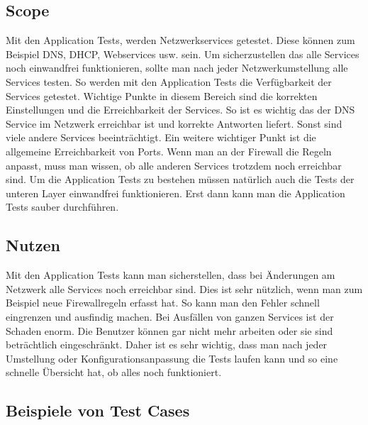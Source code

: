 \documentclass[a4,12pt]{scrartcl}
\begin{document}
\subsection{Scope}
Mit den Application Tests, werden Netzwerkservices getestet. Diese können zum Beispiel DNS, DHCP, Webservices usw. sein.
Um sicherzustellen das alle Services noch einwandfrei funktionieren, sollte man nach jeder Netzwerkumstellung alle Services testen. So werden mit den Application Tests die Verfügbarkeit der Services getestet.\newline\newline
Wichtige Punkte in diesem Bereich sind die korrekten Einstellungen und die Erreichbarkeit der Services. So ist es wichtig das der DNS Service im Netzwerk erreichbar ist und korrekte Antworten liefert. Sonst sind viele andere Services beeinträchtigt.\newline\newline
Ein weitere wichtiger Punkt ist die allgemeine Erreichbarkeit von Ports. Wenn man an der Firewall die Regeln anpasst, muss man wissen, ob alle anderen Services trotzdem noch erreichbar sind.\newline\newline
Um die Application Tests zu bestehen müssen natürlich auch die Tests der unteren Layer einwandfrei funktionieren. Erst dann kann man die Application Tests sauber durchführen.
\subsection{Nutzen}
Mit den Application Tests kann man sicherstellen, dass bei Änderungen am Netzwerk alle Services noch erreichbar sind. Dies ist sehr nützlich, wenn man zum Beispiel neue Firewallregeln erfasst hat. So kann man den Fehler schnell eingrenzen und ausfindig machen.\newline\newline
Bei Ausfällen von ganzen Services ist der Schaden enorm. Die Benutzer können gar nicht mehr arbeiten oder sie sind beträchtlich eingeschränkt. Daher ist es sehr wichtig, dass man nach jeder Umstellung oder Konfigurationsanpassung die Tests laufen kann und so eine schnelle Übersicht hat, ob alles noch funktioniert.

\subsection{Beispiele von Test Cases}
\end{document}

